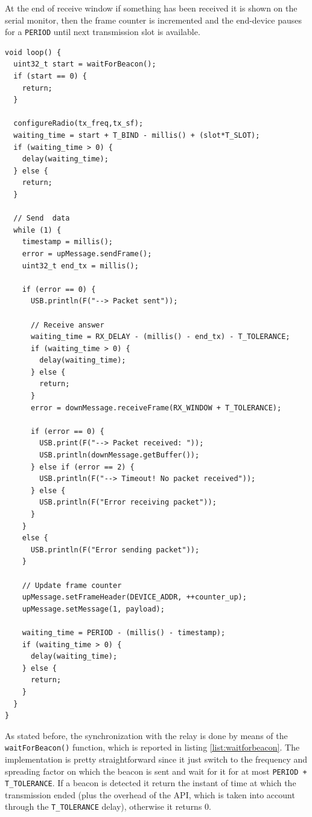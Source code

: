 At the end of receive window if something has been received it is shown on the serial monitor, then the frame counter is incremented and the end-device pauses for a \texttt{PERIOD} until next transmission slot is available.

\begin{lstlisting}[caption=Implementation of the end-device\label{list:enddev}]
void loop() {
  uint32_t start = waitForBeacon();
  if (start == 0) {
    return;
  }

  configureRadio(tx_freq,tx_sf);
  waiting_time = start + T_BIND - millis() + (slot*T_SLOT);
  if (waiting_time > 0) {
    delay(waiting_time);
  } else {
    return;
  }

  // Send  data
  while (1) {
    timestamp = millis();
    error = upMessage.sendFrame();
    uint32_t end_tx = millis();

    if (error == 0) {
      USB.println(F("--> Packet sent"));

      // Receive answer
      waiting_time = RX_DELAY - (millis() - end_tx) - T_TOLERANCE;
      if (waiting_time > 0) {
        delay(waiting_time);
      } else {
      	return;
      }
      error = downMessage.receiveFrame(RX_WINDOW + T_TOLERANCE);

      if (error == 0) {
        USB.print(F("--> Packet received: "));
        USB.println(downMessage.getBuffer());
      } else if (error == 2) {
        USB.println(F("--> Timeout! No packet received"));
      } else {
        USB.println(F("Error receiving packet"));
      }
    }
    else {
      USB.println(F("Error sending packet"));
    }

    // Update frame counter
    upMessage.setFrameHeader(DEVICE_ADDR, ++counter_up);
    upMessage.setMessage(1, payload);

    waiting_time = PERIOD - (millis() - timestamp);
    if (waiting_time > 0) {
      delay(waiting_time);
    } else {
      return;
    }
  }
}
\end{lstlisting}
As stated before, the synchronization with the relay is done by means of the \texttt{waitForBeacon()} function, which is reported in listing \ref{list:waitforbeacon}. The implementation is pretty straightforward since it just switch to the frequency and spreading factor on which the beacon is sent and wait for it for at most \texttt{PERIOD + T\_TOLERANCE}. If a beacon is detected it return the instant of time at which the transmission ended (plus the overhead of the API, which is taken into account through the \texttt{T\_TOLERANCE} delay), otherwise it returns 0.


